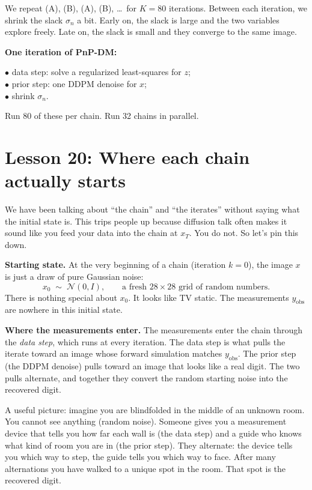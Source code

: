 \documentclass[11pt]{article}
\begin{document}
We repeat (A), (B), (A), (B), \ldots\ for $K = 80$ iterations. Between
each iteration, we shrink the slack $\sigma_n$ a bit. Early on, the
slack is large and the two variables explore freely. Late on, the slack
is small and they converge to the same image.

\begin{key}
\textbf{One iteration of PnP-DM:}
\par\smallskip
$\bullet$ data step: solve a regularized least-squares for $z$;\\
$\bullet$ prior step: one DDPM denoise for $x$;\\
$\bullet$ shrink $\sigma_n$.
\par\smallskip
Run 80 of these per chain. Run 32 chains in parallel.
\end{key}

\section{Lesson 20: Where each chain actually starts}

We have been talking about ``the chain'' and ``the iterates'' without
saying what the initial state is. This trips people up because diffusion
talk often makes it sound like you feed your data into the chain at
$x_T$. You do not. So let's pin this down.

\textbf{Starting state.} At the very beginning of a chain (iteration
$k=0$), the image $x$ is just a draw of pure Gaussian noise:
\[
x_0 \;\sim\; \mathcal{N}(0, I), \qquad \text{a fresh } 28 \times 28 \text{ grid of random numbers.}
\]
There is nothing special about $x_0$. It looks like TV static. The
measurements $y_{\text{obs}}$ are nowhere in this initial state.

\textbf{Where the measurements enter.} The measurements enter the chain
through the \emph{data step}, which runs at every iteration. The data
step is what pulls the iterate toward an image whose forward simulation
matches $y_{\text{obs}}$. The prior step (the DDPM denoise) pulls toward
an image that looks like a real digit. The two pulls alternate, and
together they convert the random starting noise into the recovered
digit.

\begin{intuition}
A useful picture: imagine you are blindfolded in the middle of an
unknown room. You cannot see anything (random noise). Someone gives you
a measurement device that tells you how far each wall is (the data
step) and a guide who knows what kind of room you are in (the prior
step). They alternate: the device tells you which way to step, the
guide tells you which way to face. After many alternations you have
walked to a unique spot in the room. That spot is the recovered
digit.
\end{intuition}
\end{document}
